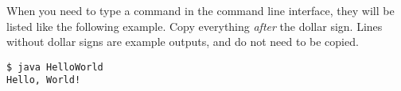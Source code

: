 When you need to type a command in the command line interface, they will be listed like the following example. Copy everything \textit{after} the dollar sign. Lines without dollar signs are example outputs, and do not need to be copied.
			
\begin{lstlisting}[style=Terminal]
$ java HelloWorld
Hello, World!
\end{lstlisting}